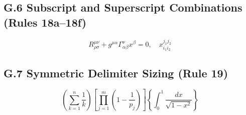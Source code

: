 \documentclass{article}
\begin{document}
\subsection*{G.6 Subscript and Superscript Combinations (Rules 18a--18f)}
\begin{equation}
R^{\mu\nu}_{\rho\sigma} + g^{\mu\alpha} \Gamma_{\alpha\beta}^\nu x^\beta = 0, \quad x_{i_1 i_2}^{j_1 j_2}
\end{equation}

\subsection*{G.7 Symmetric Delimiter Sizing (Rule 19)}
\begin{equation}
\left( \sum_{k=1}^n \frac{1}{k} \right) \left[ \prod_{j=1}^m \left( 1 - \frac{1}{p_j} \right) \right] \left\{ \int_0^1 \frac{dx}{\sqrt{1 - x^2}} \right\}
\end{equation}
\end{document}
